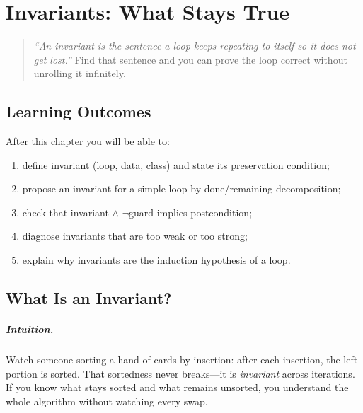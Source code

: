 \chapter{Invariants: What Stays True}
\label{ch:invariants}

\begin{quote}
\emph{``An invariant is the sentence a loop keeps repeating to itself so it does not get lost.''} Find that sentence and you can prove the loop correct without unrolling it infinitely.
\end{quote}

\noindent{}
\vspace{0.4em}

\section*{Learning Outcomes}
After this chapter you will be able to:
\begin{enumerate}[label=(L\arabic*)]
    \item define invariant (loop, data, class) and state its preservation condition;
    \item propose an invariant for a simple loop by done/remaining decomposition;
    \item check that invariant $\land$ $\neg$guard implies postcondition;
    \item diagnose invariants that are too weak or too strong;
    \item explain why invariants are the induction hypothesis of a loop.
\end{enumerate}

\section{What Is an Invariant?}
\label{sec:what-invariant}
\paragraph{Intuition.} Watch someone sorting a hand of cards by insertion: after each insertion, the left portion is sorted. That sortedness never breaks—it is \emph{invariant} across iterations. If you know what stays sorted and what remains unsorted, you understand the whole algorithm without watching every swap.

